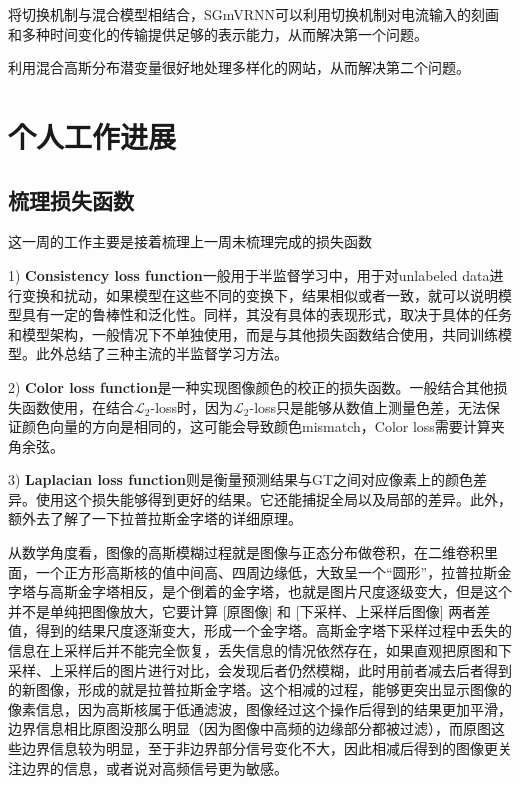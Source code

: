 \documentclass[letterpaper,12pt]{article}
\begin{document}
	将切换机制与混合模型相结合，SGmVRNN可以利用切换机制对电流输入的刻画和多种时间变化的传输提供足够的表示能力，从而解决第一个问题。
	
	利用混合高斯分布潜变量很好地处理多样化的网站，从而解决第二个问题。
	
	\section{个人工作进展}
	
	\subsection{梳理损失函数}
	
	这一周的工作主要是接着梳理上一周未梳理完成的损失函数
	
	1) \textbf{Consistency loss function}一般用于半监督学习中，用于对unlabeled data进行变换和扰动，如果模型在这些不同的变换下，结果相似或者一致，就可以说明模型具有一定的鲁棒性和泛化性。同样，其没有具体的表现形式，取决于具体的任务和模型架构，一般情况下不单独使用，而是与其他损失函数结合使用，共同训练模型。此外总结了三种主流的半监督学习方法。
	
	2) \textbf{Color loss function}是一种实现图像颜色的校正的损失函数。一般结合其他损失函数使用，在结合$\mathcal{L}_2$-loss时，因为$\mathcal{L}_2$-loss只是能够从数值上测量色差，无法保证颜色向量的方向是相同的，这可能会导致颜色mismatch，Color loss需要计算夹角余弦。
	
	3) \textbf{Laplacian loss function}则是衡量预测结果与GT之间对应像素上的颜色差异。使用这个损失能够得到更好的结果。它还能捕捉全局以及局部的差异。此外，额外去了解了一下拉普拉斯金字塔的详细原理。
	
	从数学角度看，图像的高斯模糊过程就是图像与正态分布做卷积，在二维卷积里面，一个正方形高斯核的值中间高、四周边缘低，大致呈一个“圆形”，拉普拉斯金字塔与高斯金字塔相反，是个倒着的金字塔，也就是图片尺度逐级变大，但是这个并不是单纯把图像放大，它要计算 [原图像] 和 [下采样、上采样后图像] 两者差值，得到的结果尺度逐渐变大，形成一个金字塔。高斯金字塔下采样过程中丢失的信息在上采样后并不能完全恢复，丢失信息的情况依然存在，如果直观把原图和下采样、上采样后的图片进行对比，会发现后者仍然模糊，此时用前者减去后者得到的新图像，形成的就是拉普拉斯金字塔。这个相减的过程，能够更突出显示图像的像素信息，因为高斯核属于低通滤波，图像经过这个操作后得到的结果更加平滑，边界信息相比原图没那么明显（因为图像中高频的边缘部分都被过滤），而原图这些边界信息较为明显，至于非边界部分信号变化不大，因此相减后得到的图像更关注边界的信息，或者说对高频信号更为敏感。
\end{document}
